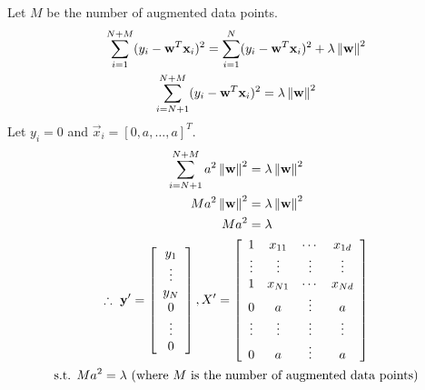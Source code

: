\documentclass{introtosml}
\newcommand{\x}{\vec{x}}
\newcommand{\w}{\vec{w}}
\begin{document}
\begin{p}
  \item
    Let $M$ be the number of augmented data points.
    \begin{gather*}
      \sum_{i=1}^{N+M} (y_i - \w^T \x_i)^2
          = \sum_{i=1}^{N} (y_i - \w^T \x_i)^2 + \lambda \norm{\w}^2 \\
      \sum_{i=N+1}^{N+M} (y_i - \w^T \x_i)^2 = \lambda \norm{\w}^2
    \end{gather*}
    Let $y_i = 0$ and $\x_i = [0, a, \ldots, a]^T $.
    \begin{gather*}
      \begin{aligned}
        \sum_{i=N+1}^{N+M} a^2 \norm{\w}^2 & = \lambda \norm{\w}^2 \\
        M a^2 \norm{\w}^2 & = \lambda \norm{\w}^2 \\
        M a^2 & = \lambda
      \end{aligned} \\
      \therefore \vec{y}' = \left[\begin{array}{cccc}
        y_1 \\ \vdots \\ y_N \\ 0 \\ \vdots \\ 0
      \end{array}\right],
      X' = \left[\begin{array}{cccc}
        1 & x_{11} & \cdots & x_{1d} \\
        \vdots & \vdots & \vdots & \vdots  \\
        1 & x_{N1} & \cdots & x_{Nd} \\
        0 & a & \vdots & a \\
        \vdots & \vdots & \vdots & \vdots  \\
        0 & a & \vdots & a \\
      \end{array}\right] \\
      \st Ma^2 = \lambda \text{(where $M$ is the number of augmented data points)}
    \end{gather*}


\end{p}
\end{document}
